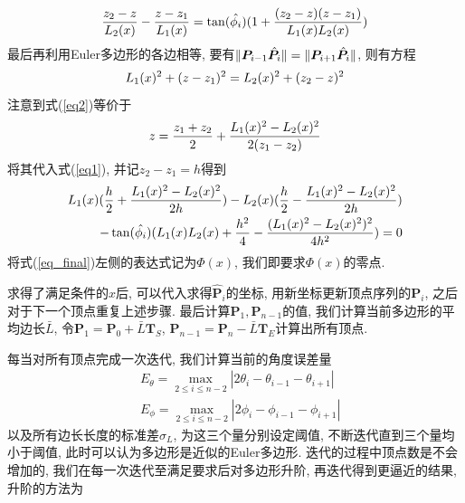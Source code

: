\documentclass[utf8]{ctexart} %
\begin{document}
	 \begin{equation}\label{eq1}
	 \frac{z_2-z}{\boldmath{L}_2(x)}-\frac{z-z_1}{\boldmath{L}_1(x)} = \tan(\hat{\phi_i})(1+\frac{(z_2-z)(z-z_1)}{\boldmath{L}_1(x)\boldmath{L}_2(x)})
	 \end{equation}
	 最后再利用Euler多边形的各边相等, 要有$\Arrowvert\boldsymbol{P}_{i-1}\hat{\boldsymbol{P}}_i\Arrowvert = \Arrowvert\boldsymbol{P}_{i+1}\hat{\boldsymbol{P}}_i\Arrowvert$, 则有方程
	 \begin{equation}\label{eq2}
	 \boldmath{L}_1(x)^2+(z-z_1)^2 =\boldmath{L}_2(x)^2+(z_2-z)^2
	 \end{equation}
	 注意到式(\ref{eq2})等价于
	 \begin{equation}
	 z = \frac{z_1+z_2}2+\frac{\boldmath{L}_1(x)^2-\boldmath{L}_2(x)^2}{2(z_1-z_2)}
	 \end{equation}
	 将其代入式(\ref{eq1}), 并记$z_2-z_1 = h$得到
	 \begin{equation}\label{eq_final}
	 \begin{aligned}
	 \boldmath{L}_1(x)(\frac h2+\frac{\boldmath{L}_1(x)^2-\boldmath{L}_2(x)^2}{2h})-\boldmath{L}_2(x)(\frac h2-\frac{\boldmath{L}_1(x)^2-\boldmath{L}_2(x)^2}{2h})\\
	 -\tan(\hat{\phi_i})(\boldmath{L}_1(x)\boldmath{L}_2(x)+\frac{h^2}4-\frac{(\boldmath{L}_1(x)^2-\boldmath{L}_2(x)^2)^2}{4h^2})=0
	 \end{aligned}
	 \end{equation}
	 将式(\ref{eq_final})左侧的表达式记为$\Phi(x)$, 我们即要求$\Phi(x)$的零点. \par 
	 求得了满足条件的$x$后, 可以代入求得$\hat{\boldsymbol{P}}_i$的坐标, 用新坐标更新顶点序列的$\boldsymbol{P}_i$, 之后对于下一个顶点重复上述步骤. 最后计算$\boldsymbol{P}_1, \boldsymbol{P}_{n-1}$的值, 我们计算当前多边形的平均边长$\bar{L}$, 令$\boldsymbol{P}_1 = \boldsymbol{P}_0+\bar{L}\boldsymbol{T}_S$, $\boldsymbol{P}_{n-1} = \boldsymbol{P}_n-\bar{L}\boldsymbol{T}_E$计算出所有顶点. \par 
	 每当对所有顶点完成一次迭代, 我们计算当前的角度误差量
	 \begin{equation}\label{error}
	 \begin{aligned}
	 &E_{\theta} = \max_{2\leq i\leq n-2}|2\theta_i-\theta_{i-1}-\theta_{i+1}|\\
	 &E_{\phi} = \max_{2\leq i\leq n-2}|2\phi_i-\phi_{i-1}-\phi_{i+1}|
	 \end{aligned}
	 \end{equation}
	 以及所有边长长度的标准差$\sigma_L$, 为这三个量分别设定阈值, 不断迭代直到三个量均小于阈值, 此时可以认为多边形是近似的Euler多边形. 迭代的过程中顶点数是不会增加的, 我们在每一次迭代至满足要求后对多边形升阶, 再迭代得到更逼近的结果, 升阶的方法为
\end{document}
